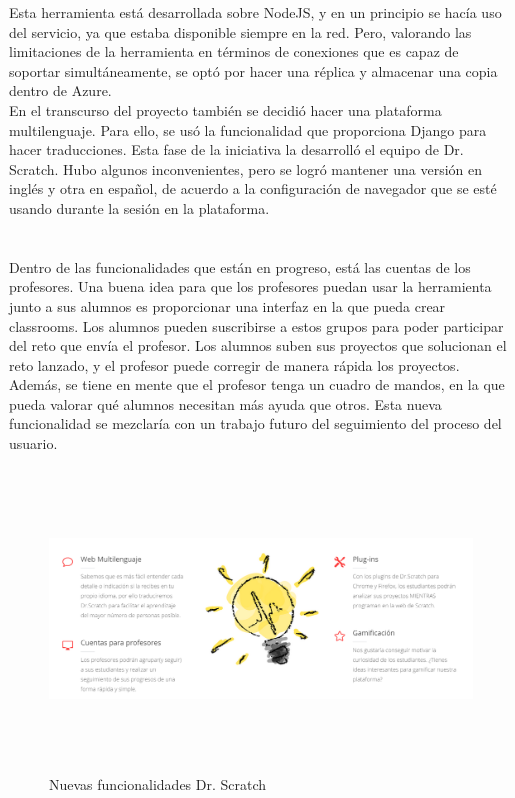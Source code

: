 \documentclass[a4paper, 12pt]{book}
\begin{document}
Esta herramienta está desarrollada sobre NodeJS, y en un principio se hacía uso del
servicio, ya que estaba disponible siempre en la red. Pero, valorando las limitaciones
de la herramienta en términos de conexiones que es capaz de soportar simultáneamente, 
se optó por hacer una réplica y almacenar una copia dentro de Azure. \\

En el transcurso del proyecto también se decidió hacer una plataforma multilenguaje. 
Para ello, se usó la funcionalidad que proporciona Django para hacer traducciones. 
Esta fase de la iniciativa la desarrolló el equipo de Dr. Scratch. Hubo algunos
inconvenientes, pero se logró mantener una versión en inglés y otra en español, de
acuerdo a la configuración de navegador que se esté usando durante la sesión en la
plataforma. \\  \\ \\


Dentro de las funcionalidades que están en progreso, está las cuentas de los profesores.
Una buena idea para que los profesores puedan usar la herramienta junto a sus alumnos
es proporcionar una interfaz en la que pueda crear classrooms. Los alumnos pueden 
suscribirse a estos grupos para poder participar del reto que envía el profesor.
Los alumnos suben sus proyectos que solucionan el reto lanzado, y el profesor puede 
corregir de manera rápida los proyectos. \\

Además, se tiene en mente que el profesor tenga un cuadro de mandos, en la que pueda
valorar qué alumnos necesitan más ayuda que otros. Esta nueva funcionalidad se mezclaría
con un trabajo futuro del seguimiento del proceso del usuario.


\begin{figure}
	\centering
	\graphicspath{{img/}}
  \includegraphics[bb=0 0 800 600, width=18cm, height=8cm, keepaspectratio]{nuevasfuncionalidades.png}
	\caption{Nuevas funcionalidades Dr. Scratch}
  \label{figura:foro_hilos}
\end{figure}
\end{document}
